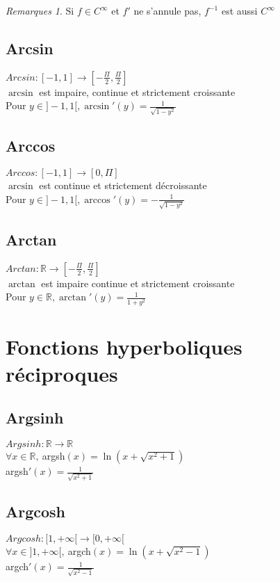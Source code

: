\documentclass[fleqn]{article}
\theoremstyle{definition} \newtheorem*{defi}{D\'efinition}
\theoremstyle{definition} \newtheorem*{theo}{Th\'eor\`eme}
\theoremstyle{definition} \newtheorem*{prop}{Propri\'et\'e}
\theoremstyle{remark} \newtheorem*{rqs}{Remarques}
\begin{document}
\begin{rqs}
	Si $f \in C^{\infty}$ et $f'$ ne s'annule pas, $f^{-1}$ est aussi $C^{\infty}$
\end{rqs}

\subsection{Arcsin}
\(Arcsin: [-1,1] \rightarrow [-\frac{\Pi}{2}, \frac{\Pi}{2}]\) \\
\(\arcsin\) est impaire, continue et strictement croissante \\
Pour \(y \in ]-1,1[, \arcsin'(y) = \frac{1}{\sqrt{1-y^2}}\) \\

\subsection{Arccos}
\(Arccos: [-1,1] \rightarrow [0, \Pi]\) \\
\(\arcsin\) est continue et strictement d\'{e}croissante \\
Pour \(y \in ]-1,1[, \arccos'(y) = -\frac{1}{\sqrt{1-y^2}}\) \\

\subsection{Arctan}
\(Arctan: \mathbb{R} \rightarrow [-\frac{\Pi}{2},\frac{\Pi}{2}]\) \\
\(\arctan\) est impaire continue et strictement croissante \\
Pour \(y \in \mathbb{R}, \arctan'(y) = \frac{1}{1+y^2}\) \\

\section{Fonctions hyperboliques r\'eciproques}
\subsection{Argsinh}
\(Argsinh: \mathbb{R} \rightarrow \mathbb{R} \) \\
$\forall x \in \mathbb{R},\ $argsh$(x) = \ln(x + \sqrt{x^2 +1})$ \\
argsh$'(x) = \frac{1}{\sqrt{x^2+1}}$

\subsection{Argcosh}
\(Argcosh: [1, +\infty[ \rightarrow [0,+\infty[ \) \\
$\forall x \in ]1,+\infty[,\  $argch$(x) = \ln(x + \sqrt{x^2-1})$ \\
argch$'(x) = \frac{1}{\sqrt{x^2-1}}$
\end{document}
